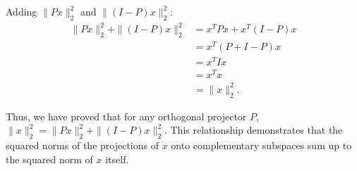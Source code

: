 \documentclass[11pt,onecolumn]{article}
\begin{document}
\begin{enumerate}[label=(\alph*)]
          Adding $\|Px\|_2^2$ and $\|(I-P)x\|_2^2$:
          \begin{align*}
              \|Px\|_2^2 + \|(I-P)x\|_2^2 & = x^T Px + x^T (I-P)x \\
                                          & = x^T (P + I - P)x    \\
                                          & = x^T Ix              \\
                                          & = x^T x               \\
                                          & = \|x\|_2^2.
          \end{align*}

          Thus, we have proved that for any orthogonal projector $P$, $\|x\|_2^2 = \|Px\|_2^2 + \|(I-P)x\|_2^2$. This relationship demonstrates that the squared norms of the projections of $x$ onto complementary subspaces sum up to the squared norm of $x$ itself.

\end{enumerate}
\end{document}
